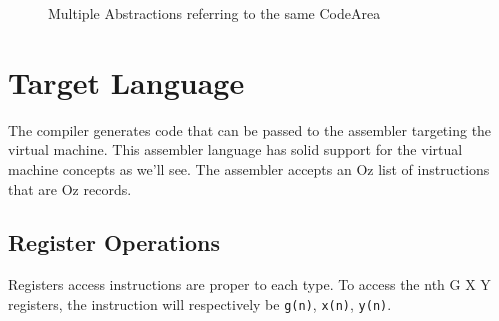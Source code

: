 \documentclass[a4paper]{memoir}
\begin{document}
\begin{figure}[h]
  \centering
{}
\caption{Multiple Abstractions referring to the same CodeArea}
\label{fig:blurps}
\end{figure}


\section{Target Language}
The compiler generates code that can be passed to the assembler targeting the virtual machine. This assembler language has solid support for the virtual machine concepts as we'll see.
The assembler accepts an Oz list of instructions that are Oz records. 

\subsection{Register Operations}\label{sec:intro:opcode:registers}
Registers access instructions are proper to each type. To access the nth G X Y
registers, the instruction will respectively be \lstinline!g(n)!,
\lstinline!x(n)!, \lstinline!y(n)!. 
\end{document}
